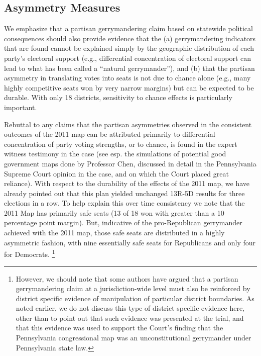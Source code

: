             \subsection*{Asymmetry Measures}
    We emphasize that a partisan gerrymandering claim based on statewide political consequences should also provide evidence that the (a) gerrymandering indicators that are found cannot be explained simply by the geographic distribution of each party’s electoral support (e.g., differential concentration of electoral support can lead to what has been called a ``natural gerrymander''), and (b) that the partisan asymmetry in translating votes into seats is not due to chance alone (e.g., many highly competitive seats won by very narrow margins) but can be expected to be durable. With only 18 districts, sensitivity to chance effects is particularly important. 
\par
    Rebuttal to any claims that the partisan asymmetries observed in the consistent outcomes of the 2011 map can be attributed primarily to differential concentration of party voting strengths, or to chance, is found in the expert witness testimony in the case (see esp. the simulations of potential good government maps done by Professor Chen, discussed in detail in the Pennsylvania Supreme Court opinion in the case, and on which the Court placed great reliance). With respect to the durability of the effects of the 2011 map, we have already pointed out that this plan yielded unchanged 13R-5D results for three elections in a row. To help explain this over time consistency we note that the 2011 Map has primarily safe seats (13 of 18 won with greater than a 10 percentage point margin). But, indicative of the pro-Republican gerrymander achieved with the 2011 map, those safe seats are distributed in a highly asymmetric fashion, with nine essentially safe seats for Republicans and only four for Democrats.
        \footnote{However, we should note that some authors \citep[e.g.,][]{Grofman2019_ELJ} have argued that a partisan gerrymandering claim at a jurisdiction-wide level must also be reinforced by district specific evidence of manipulation of particular district boundaries. As noted earlier, we do not discuss this type of district specific evidence here, other than to point out that such evidence was presented at the trial, and that this evidence was used to support the Court’s finding that the Pennsylvania congressional map was an unconstitutional gerrymander under Pennsylvania state law.}
